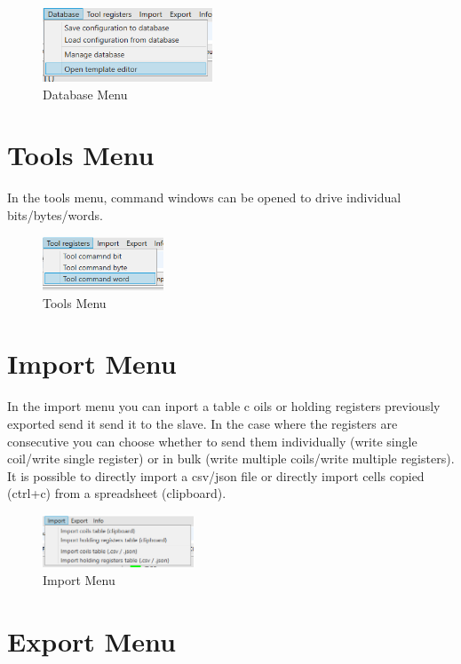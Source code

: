 \begin{figure}[H]
\centering
\includegraphics[width=0.45\textwidth]{../Img/Menu_Database.PNG}
\caption{Database Menu}
\end{figure}

\section{Tools Menu}

In the tools menu, command windows can be opened to drive individual bits/bytes/words.

\begin{figure}[H]
\centering
\includegraphics[width=0.32\textwidth]{../Img/Menu_Tools.PNG}
\caption{Tools Menu}
\end{figure}

\section{Import Menu}

In the import menu you can inport a table c
oils or holding registers previously exported
send it send it to the slave. In the case where the registers 
are consecutive you can choose whether to
send them individually (write single coil/write single register) or in bulk 
(write multiple coils/write multiple registers).
It is possible to directly import a csv/json file or
directly import cells copied (ctrl+c) from a spreadsheet
(clipboard).

\begin{figure}[H]
\centering
\includegraphics[width=0.4\textwidth]{../Img/Menu_Import.PNG}
\caption{Import Menu}
\end{figure}

\newpage
\section{Export Menu}

